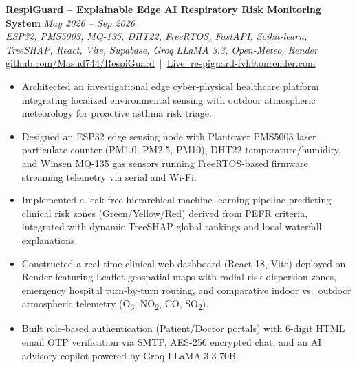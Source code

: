 \documentclass[11pt,a4paper]{article}
\begin{document}

\textbf{RespiGuard -- Explainable Edge AI Respiratory Risk Monitoring System} \hfill \textit{May 2026 -- Sep 2026} \\
\textit{ESP32, PMS5003, MQ-135, DHT22, FreeRTOS, FastAPI, Scikit-learn, TreeSHAP, React, Vite, Supabase, Groq LLaMA 3.3, Open-Meteo, Render} \\
\href{https://github.com/Masud744/RespiGuard}{github.com/Masud744/RespiGuard} \,|\, \href{https://respiguard-fvh9.onrender.com/}{Live: respiguard-fvh9.onrender.com}
\begin{itemize}
    \item Architected an investigational edge cyber-physical healthcare platform integrating localized environmental sensing with outdoor atmospheric meteorology for proactive asthma risk triage.
    \item Designed an ESP32 edge sensing node with Plantower PMS5003 laser particulate counter (PM1.0, PM2.5, PM10), DHT22 temperature/humidity, and Winsen MQ-135 gas sensors running FreeRTOS-based firmware streaming telemetry via serial and Wi-Fi.
    \item Implemented a leak-free hierarchical machine learning pipeline predicting clinical risk zones (Green/Yellow/Red) derived from PEFR criteria, integrated with dynamic TreeSHAP global rankings and local waterfall explanations.
    \item Constructed a real-time clinical web dashboard (React 18, Vite) deployed on Render featuring Leaflet geospatial maps with radial risk dispersion zones, emergency hospital turn-by-turn routing, and comparative indoor vs.\ outdoor atmospheric telemetry (O\textsubscript{3}, NO\textsubscript{2}, CO, SO\textsubscript{2}).
    \item Built role-based authentication (Patient/Doctor portals) with 6-digit HTML email OTP verification via SMTP, AES-256 encrypted chat, and an AI advisory copilot powered by Groq LLaMA-3.3-70B.
\end{itemize}
\end{document}
